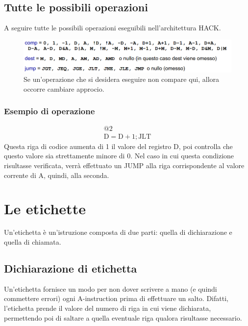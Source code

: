 \documentclass[12pt]{article}
\begin{document}
\subsection{Tutte le possibili operazioni}
\label{ssec:operazioni_possibili}
A seguire tutte le possibili operazioni eseguibili nell'architettura HACK.
\begin{figure}[!htb]
    \centering
    \includegraphics[width=.9\linewidth,height=.40\textheight,keepaspectratio]{ISA_HACK/operazioni.png} %
    \begin{center}
        \caption{\label{fig:operazioni} Se un'operazione che si desidera eseguire non compare qui, allora occorre cambiare approcio.} %
    \end{center}
\end{figure}
\subsubsection{Esempio di operazione}
\label{sssec:operazioni_esempi}
\begin{gather*}
    @2\\
    \text{D}=\text{D} + 1;\text{JLT}
\end{gather*}
Questa riga di codice aumenta di 1 il valore del registro D, poi controlla che questo valore sia strettamente minore di 0.
Nel caso in cui questa condizione risultasse verificata, verrà effettuato un JUMP alla riga corrispondente al valore corrente di A, quindi, alla seconda.

\section{Le etichette}
\label{sec:etichette}
Un'etichetta è un'istruzione composta di due parti: quella di dichiarazione e quella di chiamata.

\subsection{Dichiarazione di etichetta}
\label{ssec:dichiarazione_etichetta}
Un'etichetta fornisce un modo per non dover scrivere a mano (e quindi commettere errori) ogni A-instruction prima di effettuare un salto.
Difatti, l'etichetta prende il valore del numero di riga in cui viene dichiarata, permettendo poi di saltare a quella eventuale riga qualora risultasse necessario.
\end{document}
